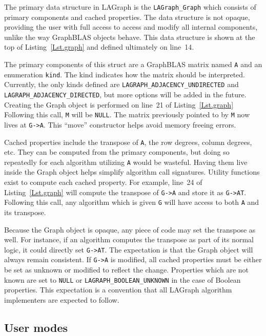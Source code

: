 The primary data structure in LAGraph is the \verb'LAGraph_Graph' which consists of primary components
and cached properties. The data structure is not opaque, providing the user with full access to access and
modify all internal components, unlike the way GraphBLAS objects behave.  This data structure is 
shown at the top of Listing~\ref{Lst.graph} and defined ultimately on line~14.

The primary components of this struct are a GraphBLAS matrix named \verb'A' and an enumeration \verb'kind'.
The kind indicates how the matrix should be interpreted.
Currently, the only kinds defined are \verb'LAGRAPH_ADJACENCY_UNDIRECTED' and 
\verb'LAGRAPH_ADJACENCY_DIRECTED', but more options will be added in the future.  Creating the 
Graph object is performed on line~21 of Listing~\ref{Lst.graph}
Following this call, \verb'M' will be \verb'NULL'. The matrix previously pointed to by \verb'M' now
lives at \verb'G->A'. This ``move'' constructor helps avoid memory freeing errors.

Cached properties include the transpose of \verb'A', the row degrees, column degrees, etc.
They can be computed from the primary components, but doing so repeatedly for each algorithm
utilizing \verb'A' would be wasteful. Having them live inside the Graph object helps simplify
algorithm call signatures. Utility functions exist to compute each cached property.  For example,
line~24 of Listing~\ref{Lst.graph} will compute the transpose of \verb'G->A' and store it as \verb'G->AT'.
Following this call, any algorithm which is given \verb'G' will have access to both \verb'A' and its transpose.

Because the Graph object is opaque, any piece of code may set the transpose as well. For instance, if an algorithm
computes the transpose as part of its normal logic, it could directly set \verb'G->AT'.
The expectation is that the Graph object will always remain consistent.
If \verb'G->A' is modified, all cached properties must be either be set as unknown or modified to reflect the change.
Properties which are not known are set to \verb'NULL' or \verb'LAGRAPH_BOOLEAN_UNKNOWN' in the case of Boolean properties.
This expectation is a convention that all LAGraph algorithm implementers are expected to follow.



\subsection{User modes}

